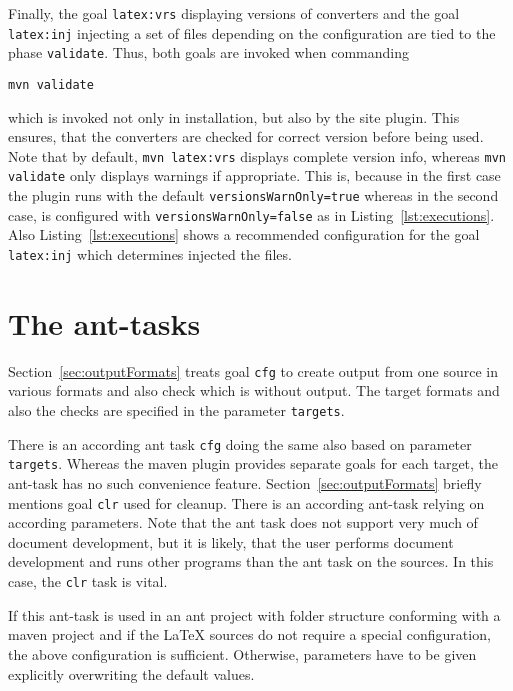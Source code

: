 Finally, the goal \texttt{latex:vrs} displaying versions of converters 
and the goal \texttt{latex:inj} injecting a set of files 
depending on the configuration 
are tied to the phase \texttt{validate}. 
Thus, both goals are invoked when commanding
%
\begin{Verbatim}[fontsize=\scriptsize]
mvn validate
\end{Verbatim}
%
which is invoked not only in installation, but also by the site plugin.
This ensures, that the converters are checked for correct version
before being used. 
Note that by default, \texttt{mvn latex:vrs} displays complete version info,
whereas \texttt{mvn validate} only displays warnings if appropriate. 
This is, because in the first case the plugin runs with the default \texttt{versionsWarnOnly=true} 
whereas in the second case, is configured with \texttt{versionsWarnOnly=false} 
as in Listing~\ref{lst:executions}. 
Also Listing~\ref{lst:executions} shows a recommended configuration 
for the goal \texttt{latex:inj} which determines injected the files. 




\section{The ant-tasks}\label{sec:usageAntTask}


Section~\ref{sec:outputFormats} treats goal \texttt{cfg} 
to create output from one source in various formats 
and also check which is without output. 
The target formats and also the checks are specified in the parameter \texttt{targets}. 

There is an according ant task \texttt{cfg} 
doing the same also based on parameter \texttt{targets}. 
Whereas the maven plugin provides separate goals for each target, 
the ant-task has no such convenience feature. 
Section~\ref{sec:outputFormats} briefly mentions goal \texttt{clr} 
used for cleanup. 
There is an according ant-task relying on according parameters. 
Note that the ant task does not support very much of document development, 
but it is likely, that the user performs document development 
and runs other programs than the ant task on the sources. 
In this case, the \texttt{clr} task is vital. 


If this ant-task is used in an ant project 
with folder structure conforming with a maven project 
and if the \LaTeX{} sources do not require a special configuration, 
the above configuration is sufficient. 
Otherwise, parameters have to be given explicitly 
overwriting the default values. 


